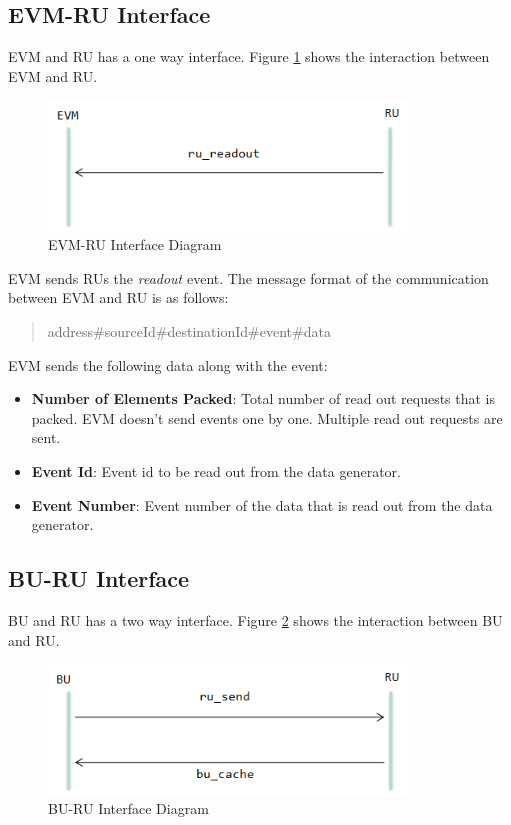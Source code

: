 \subsection{EVM-RU Interface}

EVM and RU has a one way interface. Figure \ref{fig:evm-ru} shows the interaction between EVM and RU.

\begin{figure}
	\centering
		\includegraphics[width=0.85\textwidth]{figures/evm-ru.png}
	\caption{EVM-RU Interface Diagram}
	\label{fig:evm-ru}
\end{figure}

EVM sends RUs the \textit{readout} event. The message format of the communication between EVM and RU is as follows:

\begin{quote}
	address\#sourceId\#destinationId\#event\#data
\end{quote}

EVM sends the following data along with the event:

\begin{itemize}
	\item \textbf{Number of Elements Packed}: Total number of read out requests that is packed. EVM doesn't send events one by one. Multiple read out requests are sent.
	\item \textbf{Event Id}: Event id to be read out from the data generator.
	\item \textbf{Event Number}: Event number of the data that is read out from the data generator.
\end{itemize}


\subsection{BU-RU Interface}

BU and RU has a two way interface. Figure \ref{fig:bu-ru} shows the interaction between BU and RU.

\begin{figure}
	\centering
		\includegraphics[width=0.85\textwidth]{figures/bu-ru.png}
	\caption{BU-RU Interface Diagram}
	\label{fig:bu-ru}
\end{figure}

